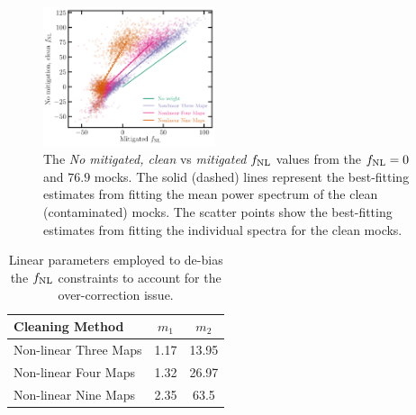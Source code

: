 \begin{figure}
\centering
\includegraphics[width=0.45\textwidth]{figures/fnlbias}
\caption{The \textit{No mitigated, clean} vs \textit{mitigated} $f_{\rm NL}$ values from the $f_{\rm NL}=0$ and $76.9$ mocks. The solid (dashed) lines represent the best-fitting estimates from fitting the mean power spectrum of the clean (contaminated) mocks. The scatter points show the best-fitting estimates from fitting the individual spectra for the clean mocks.}\label{fig:fnlbias}
\end{figure}



\begin{table}
\begin{center}
\caption{Linear parameters employed to de-bias the $f_{\rm NL}$ constraints to account for the over-correction issue. }\label{tab:debiasparams}
\begin{tabular}{lcc}
\hline
\hline
\textbf{Cleaning Method} & $m_{1}$ & $m_{2}$ \\
\hline
Non-linear Three Maps & 1.17 & 13.95 \\
Non-linear Four Maps & 1.32 & 26.97 \\
Non-linear Nine Maps & 2.35 & 63.5\\
\hline
\end{tabular}
\end{center}
\end{table}


